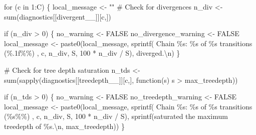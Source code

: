 \documentclass[
  letterpaper,
  DIV=11,
  numbers=noendperiod]{scrartcl}
\newenvironment{Shaded}{\begin{snugshade}}{\end{snugshade}}
\newcommand{\CommentTok}[1]{\textcolor[rgb]{0.37,0.37,0.37}{#1}}
\newcommand{\ConstantTok}[1]{\textcolor[rgb]{0.56,0.35,0.01}{#1}}
\newcommand{\ControlFlowTok}[1]{\textcolor[rgb]{0.00,0.23,0.31}{#1}}
\newcommand{\DecValTok}[1]{\textcolor[rgb]{0.68,0.00,0.00}{#1}}
\newcommand{\FunctionTok}[1]{\textcolor[rgb]{0.28,0.35,0.67}{#1}}
\newcommand{\NormalTok}[1]{\textcolor[rgb]{0.00,0.23,0.31}{#1}}
\newcommand{\OtherTok}[1]{\textcolor[rgb]{0.00,0.23,0.31}{#1}}
\newcommand{\SpecialCharTok}[1]{\textcolor[rgb]{0.37,0.37,0.37}{#1}}
\newcommand{\StringTok}[1]{\textcolor[rgb]{0.13,0.47,0.30}{#1}}
\begin{document}
\begin{Shaded}
\begin{Highlighting}[]
  \ControlFlowTok{for}\NormalTok{ (c }\ControlFlowTok{in} \DecValTok{1}\SpecialCharTok{:}\NormalTok{C) \{}
\NormalTok{    local\_message }\OtherTok{\textless{}{-}} \StringTok{""}
    \CommentTok{\# Check for divergences}
\NormalTok{    n\_div }\OtherTok{\textless{}{-}} \FunctionTok{sum}\NormalTok{(diagnostics[[}\StringTok{\textquotesingle{}divergent\_\_\textquotesingle{}}\NormalTok{]][c,])}
    
    \ControlFlowTok{if}\NormalTok{ (n\_div }\SpecialCharTok{\textgreater{}} \DecValTok{0}\NormalTok{) \{}
\NormalTok{      no\_warning }\OtherTok{\textless{}{-}} \ConstantTok{FALSE}
\NormalTok{      no\_divergence\_warning }\OtherTok{\textless{}{-}} \ConstantTok{FALSE}
\NormalTok{      local\_message }\OtherTok{\textless{}{-}} 
        \FunctionTok{paste0}\NormalTok{(local\_message,}
               \FunctionTok{sprintf}\NormalTok{(}\StringTok{\textquotesingle{}  Chain \%s: \%s of \%s transitions (\%.1f\%\%) \textquotesingle{}}\NormalTok{, }
\NormalTok{                       c, n\_div, S, }\DecValTok{100} \SpecialCharTok{*}\NormalTok{ n\_div }\SpecialCharTok{/}\NormalTok{ S),}
               \StringTok{\textquotesingle{}diverged.}\SpecialCharTok{\textbackslash{}n}\StringTok{\textquotesingle{}}\NormalTok{)}
\NormalTok{    \}}
    
    \CommentTok{\# Check for tree depth saturation}
\NormalTok{    n\_tds }\OtherTok{\textless{}{-}} \FunctionTok{sum}\NormalTok{(}\FunctionTok{sapply}\NormalTok{(diagnostics[[}\StringTok{\textquotesingle{}treedepth\_\_\textquotesingle{}}\NormalTok{]][c,], }
                        \ControlFlowTok{function}\NormalTok{(s) s }\SpecialCharTok{\textgreater{}}\NormalTok{ max\_treedepth))}
    
    \ControlFlowTok{if}\NormalTok{ (n\_tds }\SpecialCharTok{\textgreater{}} \DecValTok{0}\NormalTok{) \{}
\NormalTok{      no\_warning }\OtherTok{\textless{}{-}} \ConstantTok{FALSE}
\NormalTok{      no\_treedepth\_warning }\OtherTok{\textless{}{-}} \ConstantTok{FALSE}
\NormalTok{      local\_message }\OtherTok{\textless{}{-}} 
        \FunctionTok{paste0}\NormalTok{(local\_message,}
               \FunctionTok{sprintf}\NormalTok{(}\StringTok{\textquotesingle{}  Chain \%s: \%s of \%s transitions (\%s\%\%) \textquotesingle{}}\NormalTok{, }
\NormalTok{                       c, n\_div, S, }\DecValTok{100} \SpecialCharTok{*}\NormalTok{ n\_div }\SpecialCharTok{/}\NormalTok{ S),}
               \FunctionTok{sprintf}\NormalTok{(}\StringTok{\textquotesingle{}saturated the maximum treedepth of \%s.}\SpecialCharTok{\textbackslash{}n}\StringTok{\textquotesingle{}}\NormalTok{, }
\NormalTok{                       max\_treedepth))}
\NormalTok{    \}}
    

\end{Highlighting}
\end{Shaded}
\end{document}

